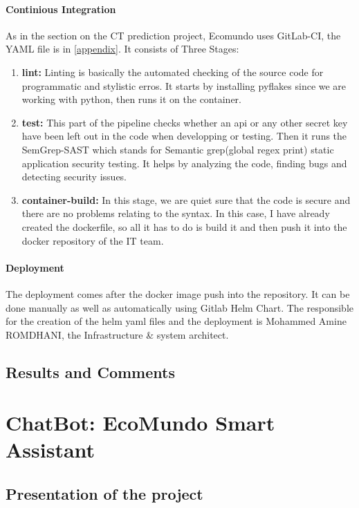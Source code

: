 \documentclass[a4paper,12pt,twoside]{report}
\begin{document}
\paragraph{Continious Integration}
As in the section on the CT prediction project, Ecomundo uses GitLab-CI, the YAML file is in \ref{appendix}. It consists of Three Stages:
\begin{enumerate}
\item \textbf{lint:} Linting is basically the automated checking of the source code for programmatic and stylistic erros. It starts by installing pyflakes since we are working with python, then runs it on the container.
\item \textbf{test:} This part of the pipeline checks whether an api or any other secret key have been left out in the code when developping or testing. Then it runs the SemGrep-SAST which stands for Semantic grep(global regex print) static application security testing. It helps by analyzing the code, finding bugs and detecting security issues.
\item \textbf{container-build:} In this stage, we are quiet sure that the code is secure and there are no problems relating to the syntax. In this case, I have already created the dockerfile, so all it has to do is build it and then push it into the docker repository of the IT team.
\end{enumerate}

\paragraph{Deployment}
The deployment comes after the docker image push into the repository. It can be done manually as well as automatically using Gitlab Helm Chart. The responsible for the creation of the helm yaml files and the deployment is Mohammed Amine ROMDHANI, the Infrastructure \& system architect.
\subsection{Results and Comments}

\section{ChatBot: EcoMundo Smart Assistant}\label{chatbot}
\subsection{Presentation of the project}
\end{document}
